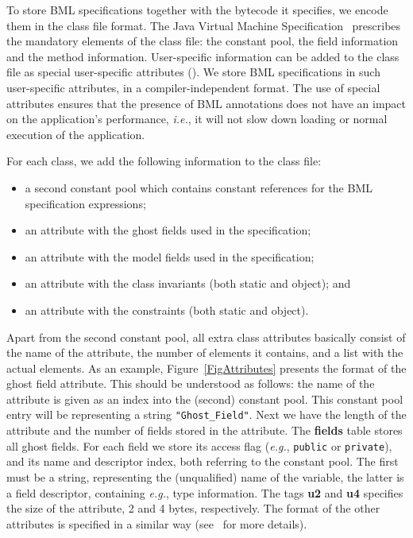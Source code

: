 To store BML specifications together with the bytecode it specifies,
we encode them in the class file format. The Java Virtual Machine
Specification~\cite{LindholmY99} prescribes the mandatory elements of the
class file: the constant pool, the field information and the method
information. User-specific information can be added to the class file
as special user-specific attributes (\cite[\S4.7.1]{LindholmY99}).  We
store BML specifications in such user-specific attributes, in a
compiler-independent format. The use of special attributes ensures
that the presence of BML annotations does not have an impact on the
application's performance, \emph{i.e.}, it will not slow down loading
or normal execution of the application.

For each class, we add the following information to the class file:
\begin{itemize}
\item a second constant pool which contains constant references
      for the BML specification expressions;
\item an attribute with the ghost fields used in the specification;
\item an attribute with the model fields used in the specification;
\item an attribute with the class invariants (both static and object); and
\item an attribute with the constraints (both static and object).
\end{itemize}
Apart from the second constant pool, all extra class attributes
basically consist of the name of the attribute, the number of elements
it contains, and a list with the actual elements.  As an example,
Figure~\ref{FigAttributes} presents the format of the ghost field
attribute. This should be understood as follows: the name of the
attribute is given as an index into the (second) constant pool. This
constant pool entry will be representing a string
\texttt{"Ghost\_Field"}. Next we have the length of the attribute
and the number of fields stored in the attribute.
The \textbf{fields} table stores all ghost
fields. For each field we store its access flag (\emph{e.g.},
\texttt{public} or
\texttt{private}), and its name and descriptor index, both
referring to the constant pool. The first must be a string,
representing the (unqualified) name of the variable, the latter is a
field descriptor, containing \emph{e.g.}, type information.  The tags
\textbf{u2} and \textbf{u4} specifies the size of the attribute, 2 and
4 bytes, respectively. The format of the other attributes is
specified in a similar way (see~\cite{Pavlova07} for more details).



